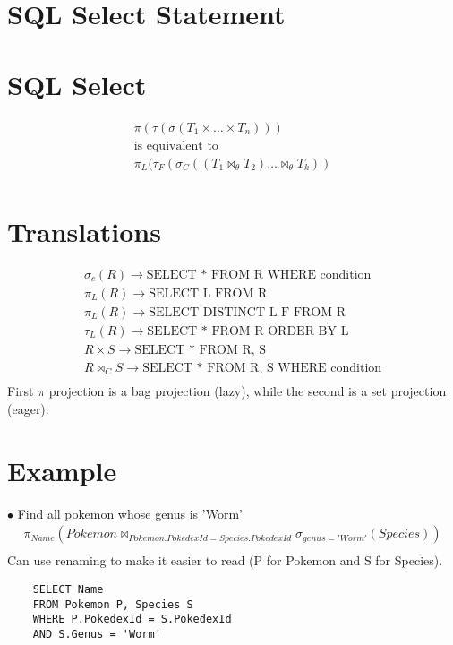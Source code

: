 \documentclass[twoside]{article}
\begin{document}
\newpage
\section{SQL Select Statement}

\section*{SQL Select}
\begin{gather*}
    \pi(\tau(\sigma(T_1 \times \dots \times T_n))) \\
    \text{is equivalent to} \\
    \pi_L(\tau_F(\sigma_C((T_1 \bowtie_\theta T_2)\dots \bowtie_\theta T_k)) \\
\end{gather*}

\section*{Translations}
\begin{gather*}
    \sigma_c(R) \rightarrow \text{SELECT * FROM R WHERE condition} \\
    \pi_L(R) \rightarrow \text{SELECT L FROM R} \\
    \pi_L(R) \rightarrow \text{SELECT DISTINCT L F FROM R} \\
    \tau_L(R) \rightarrow \text{SELECT * FROM R ORDER BY L} \\
    R \times S \rightarrow \text{SELECT * FROM R, S} \\
    R \bowtie_C S \rightarrow \text{SELECT * FROM R, S WHERE condition} \\
\end{gather*}
First $\pi$ projection is a bag projection (lazy), while the second is a set
projection (eager).

\section*{Example}
$\bullet$ Find all pokemon whose genus is 'Worm'
\begin{gather*}
    \pi_{Name}({Pokemon \bowtie_{Pokemon.PokedexId = Species.PokedexId} 
    \sigma_{genus = 'Worm'}({Species})}) \\
\end{gather*}
Can use renaming to make it easier to read (P for Pokemon and S for Species).
\begin{verbatim}
    SELECT Name
    FROM Pokemon P, Species S
    WHERE P.PokedexId = S.PokedexId
    AND S.Genus = 'Worm'
\end{verbatim}
\end{document}
